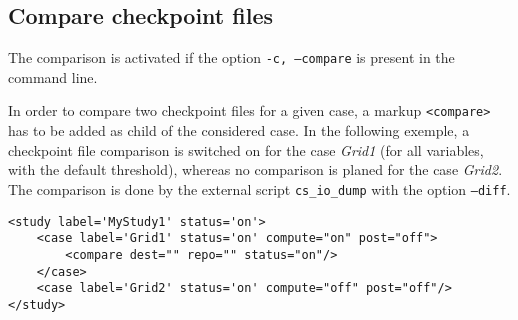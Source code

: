 \documentclass[a4paper,10pt,twoside]{csshortdoc}
\begin{document}
\subsection{Compare checkpoint files}

The comparison is activated if the option \texttt{-c, --compare} is present in
the command line.

In order to compare two checkpoint files for a given case, a markup
\texttt{<compare>} has to be added as child of the considered case.
In the following exemple, a checkpoint file comparison is switched on for the
case \textit{Grid1} (for all
variables, with the default threshold), whereas no comparison is planed for
the case \textit{Grid2}. The comparison is done by the external
script \texttt{cs\_io\_dump} with the option \texttt{--diff}.

\small
\begin{verbatim}
<study label='MyStudy1' status='on'>
    <case label='Grid1' status='on' compute="on" post="off">
        <compare dest="" repo="" status="on"/>
    </case>
    <case label='Grid2' status='on' compute="off" post="off"/>
</study>
\end{verbatim}
\normalsize
\end{document}
